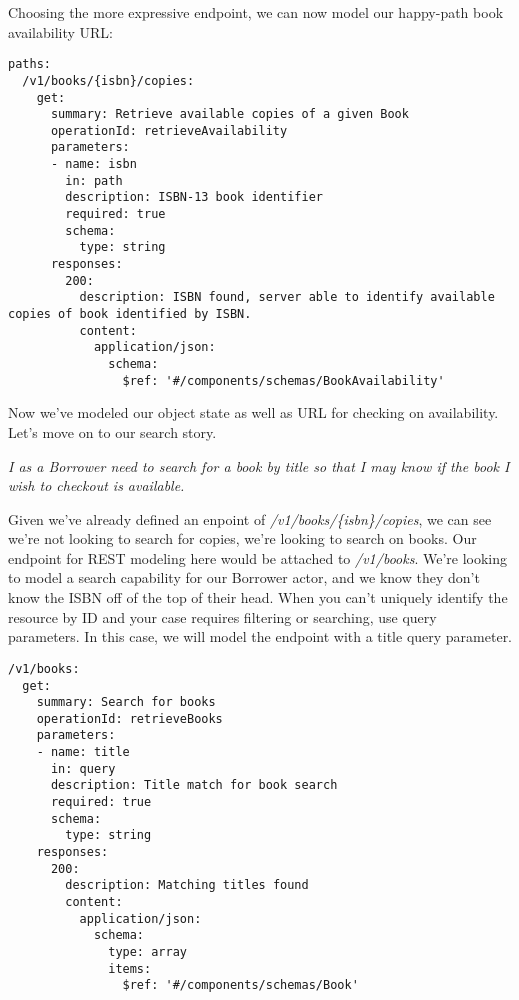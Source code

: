 \begin{minipage}{\linewidth}
Choosing the more expressive endpoint, we can now model our happy-path book availability URL:

\begin{code}
\begin{lstlisting}[belowskip=-\baselineskip]
paths:
  /v1/books/{isbn}/copies:
    get:
      summary: Retrieve available copies of a given Book
      operationId: retrieveAvailability
      parameters:
      - name: isbn
        in: path
        description: ISBN-13 book identifier
        required: true
        schema:
          type: string
      responses:
        200:
          description: ISBN found, server able to identify available copies of book identified by ISBN.
          content:
            application/json:
              schema:
                $ref: '#/components/schemas/BookAvailability'
\end{lstlisting}
\end{code}
\end{minipage}

Now we've modeled our object state as well as URL for checking on availability.  Let's move on to our search story.

\textit{I as a Borrower need to search for a book by title so that I may know if the book I wish to checkout is available.}

Given we've already defined an enpoint of \textit{/v1/books/\{isbn\}/copies}, we can see we're not looking to search for copies, we're looking to search on books.  Our endpoint for REST modeling here would be attached to \textit{/v1/books}.  We're looking to model a search capability for our Borrower actor, and we know they don't know the ISBN off of the top of their head.  When you can't uniquely identify the resource by ID and your case requires filtering or searching, use query parameters.   In this case, we will model the endpoint with a title query parameter.

\begin{minipage}{\linewidth}

\begin{code}
\begin{lstlisting}[belowskip=-\baselineskip]
/v1/books:
  get:
    summary: Search for books
    operationId: retrieveBooks
    parameters:
    - name: title
      in: query
      description: Title match for book search
      required: true
      schema:
        type: string
    responses:
      200:
        description: Matching titles found
        content:
          application/json:
            schema:
              type: array
              items:
                $ref: '#/components/schemas/Book'
\end{lstlisting}
\end{code}
\end{minipage}

